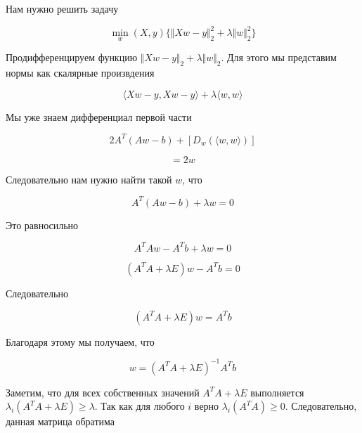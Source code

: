 \documentclass{article}
\begin{document}
    Нам нужно решить задачу

    \begin{equation}
        \min_{w}(X, y)\{ \Vert Xw - y \Vert_{2}^{2} + \lambda \Vert w \Vert_{2}^{2} \}
    \end{equation}

    Продифференцируем функцию $\Vert Xw - y \Vert_{2} + \lambda \Vert w \Vert_{2}$. Для этого 
    мы представим нормы как скалярные произвдения

    \begin{equation}
        \langle Xw - y,  Xw - y \rangle + \lambda \langle w, w \rangle
    \end{equation}

    Мы уже знаем дифференциал первой части

    \begin{equation}
        2 A^{T} (A w - b) + [D_{w}(\langle w, w \rangle)]
    \end{equation}

    \begin{equation}
        [D_{w}(\langle w, w \rangle)] = 2 w
    \end{equation}

    Следовательно нам нужно найти такой $w$, что 

    \begin{equation}
        A^{T} (A w - b) + \lambda w = 0
    \end{equation}

    Это равносильно

    \begin{equation}
        A^{T} A w - A^{T} b + \lambda w = 0
    \end{equation}

    \begin{equation}
        (A^{T} A + \lambda E)w - A^{T} b = 0
    \end{equation}

    Следовательно

    \begin{equation}
        (A^{T} A + \lambda E)w = A^{T} b
    \end{equation}

    Благодаря этому мы получаем, что 

    \begin{equation}
        w = (A^{T} A + \lambda E)^{-1}  A^{T} b
    \end{equation}

    Заметим, что для всех собственных значений $A^{T} A + \lambda E$ выполняется $\lambda_{i}(A^{T} A + \lambda E) \geq \lambda$. 
    Так как для любого $i$ верно $\lambda_{i}(A^{T} A) \geq 0$. Следовательно, данная матрица обратима
\end{document}
